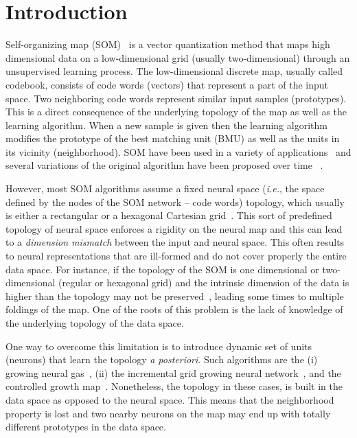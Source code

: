 \section{Introduction}

Self-organizing map (SOM)~\citep{Kohonen:1982} is a vector quantization method
that maps high dimensional data on a low-dimensional grid (usually
two-dimensional) through an unsupervised learning process. The low-dimensional
discrete map, usually called codebook, consists of code words (vectors) that
represent a part of the input space. Two neighboring code words represent
similar input samples (prototypes). This is a direct consequence of the
underlying topology of the map as well as the learning algorithm. When
a new sample is given then the learning algorithm modifies the prototype of 
the best matching unit (BMU) as well as the units in its vicinity (neighborhood).
SOM have been used in a variety of applications~\citep{Kaski:1998,Oja:2003,Polla:2009}
and several variations of the original algorithm have been proposed
over time ~\citep{Kohonen:2001}.

However, most SOM algorithms assume a fixed neural space (\emph{i.e.},
the space defined by the nodes of the SOM network -- code words)  topology, 
which usually is either a rectangular or a hexagonal Cartesian 
grid~\citet{Astudillo:2014}. This sort of predefined topology of neural space 
enforces a rigidity on the neural map and this can lead to a \emph{dimension
mismatch} between the input and neural space. This often results to neural
representations that are ill-formed and do not cover properly the entire data
space. For instance, if the topology of the SOM is one dimensional or 
two-dimensional (regular or hexagonal grid) and the intrinsic dimension of the 
data is higher than the topology may not be preserved~\citep{Villmann:1999},
leading some times to multiple foldings of the map. One of the roots of this
problem is the lack of knowledge of the underlying topology of the data space.

One way to overcome this limitation is to introduce dynamic set of units 
(neurons) that learn the topology \emph{a posteriori}. 
Such algorithms are the (i) growing neural gas~\citep{Fritzke:1994},
(ii) the incremental grid growing neural network~\citep{Blackmore:1995}, and
the controlled growth map~\citep{Alahakoon:2000}. Nonetheless, the topology
in these cases, is built in the data space as opposed to the neural
space. This means that the neighborhood property is lost and two nearby neurons
on the map may end up with totally different prototypes in the data space.

